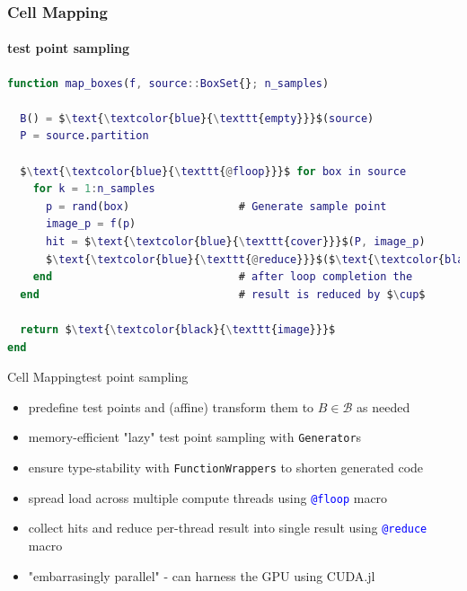 \documentclass[
  english,            %
  aspectratio=169,    %
]{tumbeamer}
\newcommand{\cB}{\mathcal{B}}
\begin{document}
\begin{frame}[fragile]
\frametitle{Cell Mapping}
\framesubtitle{test point sampling}

\medskip

\begin{lstlisting}[language=Matlab,mathescape]
function map_boxes(f, source::BoxSet{}; n_samples)

  B() = $\text{\textcolor{blue}{\texttt{empty}}}$(source)                    # Initialize empty BoxSet
  P = source.partition

  $\text{\textcolor{blue}{\texttt{@floop}}}$ for box in source
    for k = 1:n_samples
      p = rand(box)                 # Generate sample point
      image_p = f(p)
      hit = $\text{\textcolor{blue}{\texttt{cover}}}$(P, image_p)            # Box in P covering the point fp
      $\text{\textcolor{blue}{\texttt{@reduce}}}$($\text{\textcolor{black}{\texttt{image}}}$ = B() $\cup$ hit) $\quad\ \ \,$     # Each thread collects hits,
    end                             # after loop completion the 
  end                               # result is reduced by $\cup$

  return $\text{\textcolor{black}{\texttt{image}}}$
end 
\end{lstlisting}

\end{frame}

\begin{frame}{Cell Mapping}{test point sampling}
  
\begin{itemize}
  \item predefine test points and (affine) transform them to $B \in \cB$ as needed
  \item memory-efficient "lazy" test point sampling with \texttt{Generator}s
  \item ensure type-stability with \texttt{FunctionWrappers} to shorten generated code
  \item spread load across multiple compute threads using \textcolor{blue}{\texttt{@floop}} macro
  \item collect hits and reduce per-thread result into single result using \textcolor{blue}{\texttt{@reduce}} macro
  \item "embarrasingly parallel" - can harness the GPU using CUDA.jl
\end{itemize}

\end{frame}
\end{document}
